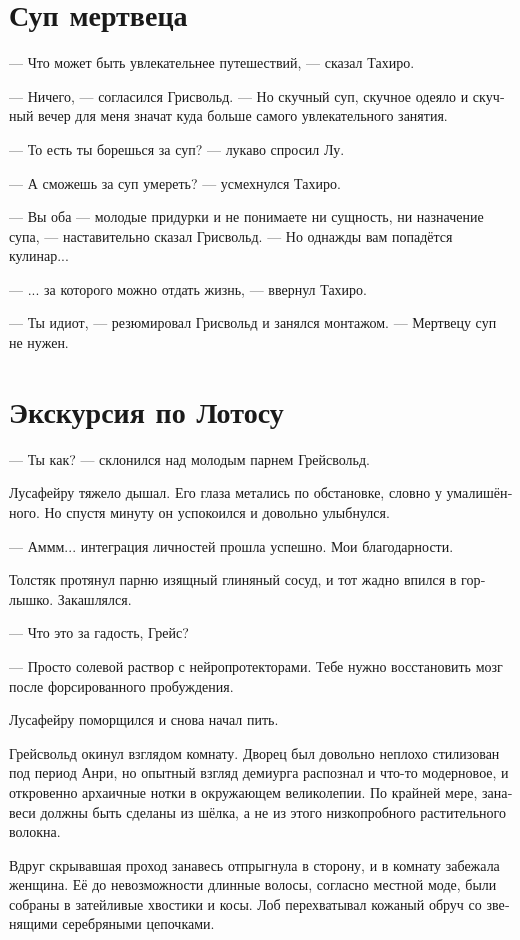 \documentclass[a4paper,12pt,fleqn]{book}\usepackage{cooltooltips}\usepackage{polyglossia}\setdefaultlanguage[babelshorthands=true]{russian}\setotherlanguage{english}\defaultfontfeatures{Ligatures=TeX,Mapping=tex-text} \usepackage{xcolor}\definecolor{lightgray}{HTML}{bbbbbb}\color{lightgray}\newcommand{\ml}[3]{\textenglish{\textcolor{black}{#3}}}
\begin{document}
{\section{Суп мертвеца}

--- Что может быть увлекательнее путешествий, --- сказал Тахиро.

--- Ничего, --- согласился Грисвольд.
--- Но скучный суп, скучное одеяло и скучный вечер для меня значат куда больше самого увлекательного занятия.

--- То есть ты борешься за суп? --- лукаво спросил Лу.

--- А сможешь за суп умереть? --- усмехнулся Тахиро.

--- Вы оба --- молодые придурки и не понимаете ни сущность, ни назначение супа, --- наставительно сказал Грисвольд.
--- Но однажды вам попадётся кулинар...

--- ... за которого можно отдать жизнь, --- ввернул Тахиро.

--- Ты идиот, --- резюмировал Грисвольд и занялся монтажом.
--- Мертвецу суп не нужен.

\section{Экскурсия по Лотосу}

--- Ты как? --- склонился над молодым парнем Грейсвольд.

Лусафейру тяжело дышал.
Его глаза метались по обстановке, словно у умалишённого. Но спустя минуту он успокоился и довольно улыбнулся.

--- Аммм... интеграция личностей прошла успешно.
Мои благодарности.

Толстяк протянул парню изящный глиняный сосуд, и тот жадно впился в горлышко.
Закашлялся.

--- Что это за гадость, Грейс?

--- Просто солевой раствор с нейропротекторами.
Тебе нужно восстановить мозг после форсированного пробуждения.

Лусафейру поморщился и снова начал пить.

Грейсвольд окинул взглядом комнату.
Дворец был довольно неплохо стилизован под период Анри, но опытный взгляд демиурга распознал и что-то модерновое, и откровенно архаичные нотки в окружающем великолепии.
По крайней мере, занавеси должны быть сделаны из шёлка, а не из этого низкопробного растительного волокна.

Вдруг скрывавшая проход занавесь отпрыгнула в сторону, и в комнату забежала женщина.
Её до невозможности длинные волосы, согласно местной моде, были собраны в затейливые хвостики и косы.
Лоб перехватывал кожаный обруч со звенящими серебряными цепочками.

}
\end{document}
